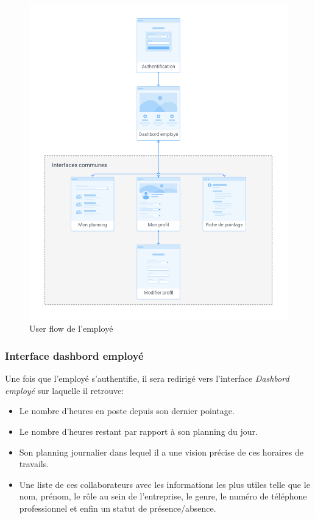 \begin{figure}[h!]
    \vspace{-10pt}
    \centering
    \includegraphics[scale=0.38 ]{images/interface/Espace employe.png}
    \vspace{-20pt}
    \caption{User flow de l'employé}
    \label{fig91}
\end{figure} 

\clearpage

\subsubsection*{Interface dashbord employé}
Une fois que l’employé s'authentifie, il sera redirigé vers l’interface
\emph{Dashbord employé} sur laquelle il retrouve:

\begin{itemize}
    \item[\textbullet] Le nombre d’heures en poste depuis son dernier pointage.
    \item[\textbullet] Le nombre d’heures restant par rapport à son
        planning du jour.
    \item[\textbullet] Son planning journalier dans lequel il a une vision
        précise de ces horaires de travails.
    \item[\textbullet] Une liste de ces collaborateurs avec les informations les
        plus utiles telle que le nom, prénom, le rôle au sein de l’entreprise,
        le genre, le numéro de téléphone professionnel et enfin un statut de
        présence/absence.
\end{itemize}

